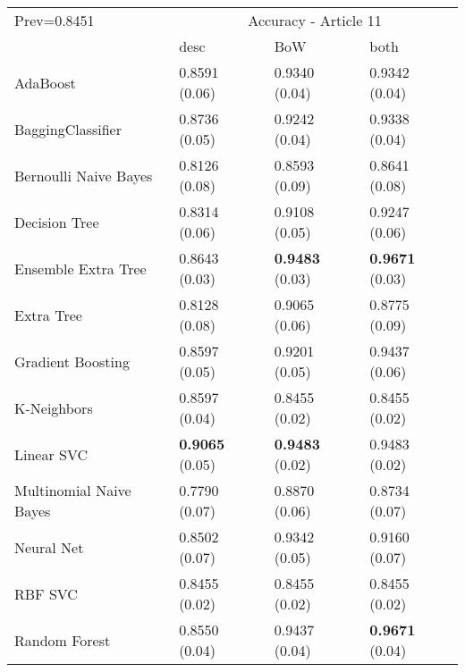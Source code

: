 \begin{tabular}{|l|l|l|l| }
\hline
Prev=0.8451 &  \multicolumn{3}{c|}{Accuracy - Article 11} \\
\cline{2-4} & desc & BoW & both \\ \hline
AdaBoost                & 0.8591 (0.06) & 0.9340 (0.04) & 0.9342 (0.04)\\
BaggingClassifier       & 0.8736 (0.05) & 0.9242 (0.04) & 0.9338 (0.04)\\
Bernoulli Naive Bayes   & 0.8126 (0.08) & 0.8593 (0.09) & 0.8641 (0.08)\\
Decision Tree           & 0.8314 (0.06) & 0.9108 (0.05) & 0.9247 (0.06)\\
Ensemble Extra Tree     & 0.8643 (0.03) & {\bf 0.9483} (0.03) & {\bf 0.9671} (0.03)\\
Extra Tree              & 0.8128 (0.08) & 0.9065 (0.06) & 0.8775 (0.09)\\
Gradient Boosting       & 0.8597 (0.05) & 0.9201 (0.05) & 0.9437 (0.06)\\
K-Neighbors             & 0.8597 (0.04) & 0.8455 (0.02) & 0.8455 (0.02)\\
Linear SVC              & {\bf 0.9065} (0.05) & {\bf 0.9483} (0.02) & 0.9483 (0.02)\\
Multinomial Naive Bayes & 0.7790 (0.07) & 0.8870 (0.06) & 0.8734 (0.07)\\
Neural Net              & 0.8502 (0.07) & 0.9342 (0.05) & 0.9160 (0.07)\\
RBF SVC                 & 0.8455 (0.02) & 0.8455 (0.02) & 0.8455 (0.02)\\
Random Forest           & 0.8550 (0.04) & 0.9437 (0.04) & {\bf 0.9671} (0.04)\\
\hline
\end{tabular}